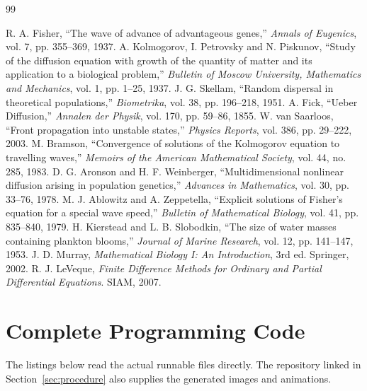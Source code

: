 \documentclass[11pt,a4paper]{article}
\begin{document}
\clearpage
\begin{thebibliography}{99}
 R. A. Fisher, ``The wave of advance of advantageous genes,'' \emph{Annals of Eugenics}, vol. 7, pp. 355--369, 1937.
 A. Kolmogorov, I. Petrovsky and N. Piskunov, ``Study of the diffusion equation with growth of the quantity of matter and its application to a biological problem,'' \emph{Bulletin of Moscow University, Mathematics and Mechanics}, vol. 1, pp. 1--25, 1937.
 J. G. Skellam, ``Random dispersal in theoretical populations,'' \emph{Biometrika}, vol. 38, pp. 196--218, 1951.
 A. Fick, ``Ueber Diffusion,'' \emph{Annalen der Physik}, vol. 170, pp. 59--86, 1855.
 W. van Saarloos, ``Front propagation into unstable states,'' \emph{Physics Reports}, vol. 386, pp. 29--222, 2003.
 M. Bramson, ``Convergence of solutions of the Kolmogorov equation to travelling waves,'' \emph{Memoirs of the American Mathematical Society}, vol. 44, no. 285, 1983.
 D. G. Aronson and H. F. Weinberger, ``Multidimensional nonlinear diffusion arising in population genetics,'' \emph{Advances in Mathematics}, vol. 30, pp. 33--76, 1978.
 M. J. Ablowitz and A. Zeppetella, ``Explicit solutions of Fisher's equation for a special wave speed,'' \emph{Bulletin of Mathematical Biology}, vol. 41, pp. 835--840, 1979.
 H. Kierstead and L. B. Slobodkin, ``The size of water masses containing plankton blooms,'' \emph{Journal of Marine Research}, vol. 12, pp. 141--147, 1953.
 J. D. Murray, \emph{Mathematical Biology I: An Introduction}, 3rd ed. Springer, 2002.
 R. J. LeVeque, \emph{Finite Difference Methods for Ordinary and Partial Differential Equations}. SIAM, 2007.
\end{thebibliography}



\clearpage
\appendix
\section{Complete Programming Code}\label{app:code}
The listings below read the actual runnable files directly. The repository linked in
Section~\ref{sec:procedure} also supplies the generated images and animations.

\end{document}
